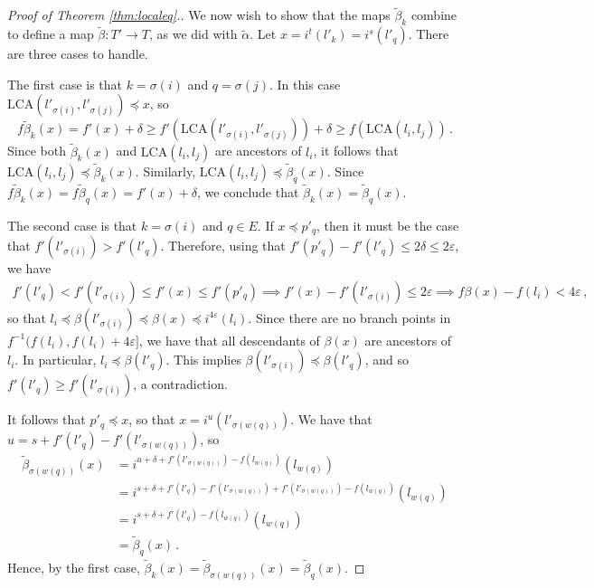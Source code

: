 \documentclass[10pt,a4paper]{amsart}
\newcommand{\LCA}{\mathrm{LCA}}
\renewcommand{\epsilon}{\varepsilon}
\begin{document}
\begin{proof}[Proof of Theorem \ref{thm:localeq}.]
We now wish to show that the maps $\widetilde\beta_k$ combine to define a map $\widetilde\beta:T' \to T$, as we did with $\widetilde\alpha$. Let $x = i^t(l'_k) = i^s(l'_q)$. There are three cases to handle.

The first case is that $k = \sigma(i)$ and $q = \sigma(j)$. In this case $\LCA(l'_{\sigma(i)}, l'_{\sigma(j)})\preceq x$, so
\begin{equation*}
    f\widetilde\beta_k(x) = f'(x) + \delta \geq f'(\LCA(l'_{\sigma(i)}, l'_{\sigma(j)})) + \delta \geq f(\LCA(l_i,l_j))\,.
\end{equation*}
Since both $\widetilde\beta_k(x)$ and $\LCA(l_i,l_j)$ are ancestors of $l_i$, it follows that $\LCA(l_i,l_j) \preceq \widetilde \beta_k(x)$. Similarly, $\LCA(l_i,l_j) \preceq \widetilde \beta_q(x)$. Since $f\widetilde\beta_k(x) = f\widetilde\beta_q(x) = f'(x) + \delta$, we conclude that $\widetilde\beta_k(x) = \widetilde\beta_q(x)$.

The second case is that $k = \sigma(i)$ and $q \in E$. If $x \preceq p'_q$, then it must be the case that $f'(l'_{\sigma(i)}) > f'(l'_q)$. Therefore, using that $f'(p'_q) - f'(l'_q) \leq 2\delta \leq 2\epsilon$, we have
\begin{align*}
    f'(l'_q) < f'(l'_{\sigma(i)}) \leq f'(x) \leq f'(p'_q) \implies f'(x) - f'(l'_{\sigma(i)}) \leq 2\epsilon \implies f\beta(x) - f(l_i) < 4\epsilon\,,
\end{align*}
so that $l_i \preceq \beta(l'_{\sigma(i)}) \preceq \beta(x) \preceq i^{4\epsilon}(l_i)$. Since there are no branch points in $f^{-1}(f(l_i),f(l_i) + 4\epsilon]$, we have that all descendants of $\beta(x)$ are ancestors of $l_i$. In particular, $l_i \preceq \beta(l'_q)$. This implies $\beta(l'_{\sigma(i)}) \preceq \beta(l'_q)$, and so $f'(l'_q) \geq f'(l'_{\sigma(i)})$, a contradiction.

It follows that $p'_q \preceq x$, so that $x = i^u(l'_{\sigma(w(q))})$. We have that $u = s + f'(l'_q) - f'(l'_{\sigma(w(q))})$, so
\begin{align*}
    \widetilde\beta_{\sigma(w(q))}(x) &= i^{u + \delta + f'(l'_{\sigma(w(q))}) - f(l_{w(q)})}(l_{w(q)})\\
    & = i^{s + \delta + f'(l'_q) - f'(l'_{\sigma(w(q))}) + f'(l'_{\sigma(w(q))}) - f(l_{w(q)})}(l_{w(q)})\\
    &= i^{s + \delta + f'(l'_q) - f(l_{w(q)})}(l_{w(q)})\\
    & = \widetilde\beta_{q}(x)\,.
\end{align*}
Hence, by the first case, $\widetilde\beta_k(x) = \widetilde\beta_{\sigma(w(q))}(x) = \widetilde{\beta}_{q}(x)$.


\end{proof}
\end{document}

